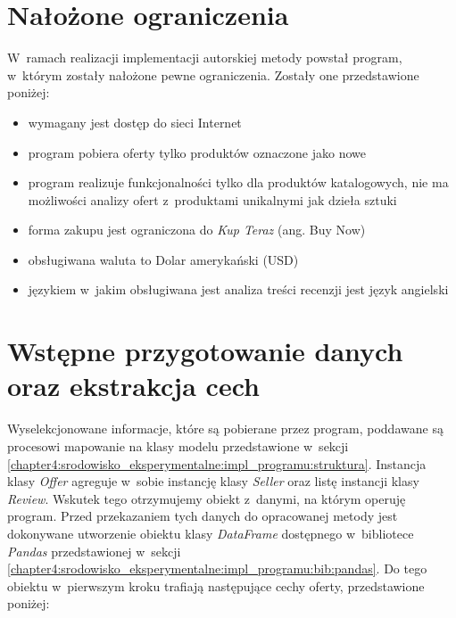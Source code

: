 \documentclass[../Kamil_Kowalewski_Main.tex]{subfiles}
\begin{document}
{    \section{Nałożone ograniczenia}
    \label{chapter4:srodowisko_eksperymentalne:ograniczenia} {
        W~ramach realizacji implementacji autorskiej metody powstał program, w~którym
        zostały nałożone pewne ograniczenia. Zostały one przedstawione poniżej:
        \begin{itemize}[noitemsep,topsep=1pt]
            \item wymagany jest dostęp do sieci Internet
            \item program pobiera oferty tylko produktów oznaczone jako nowe
            \item program realizuje funkcjonalności tylko dla produktów katalogowych,
            nie ma możliwości analizy ofert z~produktami unikalnymi jak dzieła sztuki
            \item forma zakupu jest ograniczona do \textit{Kup Teraz} (ang. Buy Now)
            \item obsługiwana waluta to Dolar amerykański (USD)
            \item językiem w~jakim obsługiwana jest analiza treści recenzji jest
            język angielski
        \end{itemize}
    }

    \section{Wstępne przygotowanie danych oraz ekstrakcja cech}
    \label{chapter4:srodowisko_eksperymentalne:preprocessing} {
        Wyselekcjonowane informacje, które są pobierane przez program, poddawane są
        procesowi mapowanie na klasy modelu przedstawione w~sekcji
        \ref{chapter4:srodowisko_eksperymentalne:impl_programu:struktura}. Instancja
        klasy \textit{Offer} agreguje w~sobie instancję klasy \textit{Seller} oraz listę
        instancji klasy \textit{Review}. Wskutek tego otrzymujemy obiekt z~danymi, na
        którym operuję program. Przed przekazaniem tych danych do opracowanej metody
        jest dokonywane utworzenie obiektu klasy \textit{DataFrame} dostępnego
        w~bibliotece \textit{Pandas} przedstawionej w~sekcji
        \ref{chapter4:srodowisko_eksperymentalne:impl_programu:bib:pandas}. Do tego
        obiektu w~pierwszym kroku trafiają następujące cechy oferty, przedstawione
        poniżej:

}}
\end{document}

